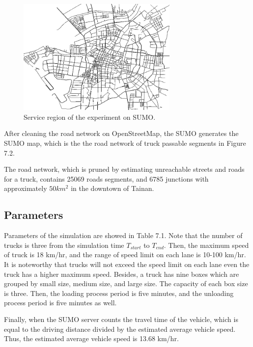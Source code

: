 \documentclass[12pt]{ksthesis}
\begin{document}
\begin{thesis}
{\begin{figure}[H]
\centering
\includegraphics[width=0.7\textwidth]{./Thesis_figures/F7-2_SUMOMap.PNG}
\caption{\large  Service region of the experiment on SUMO.}
\vspace{0.5cm}
\label{Fig:SUMOMap}
\end{figure}

After cleaning the road network on OpenStreetMap, the SUMO generates the SUMO map, which is the the road network of truck passable segments in Figure 7.2.

The road network, which is pruned by estimating unreachable streets and roads for a truck, contains 25069 roads segments, and 6785 junctions with approximately \textbf{$50km^{2}$   }in the downtown of Tainan.




\subsection{Parameters}
Parameters of the simulation are showed in Table 7.1. Note that the number of trucks is three from the simulation time $T_{start}$ to $T_{end}$. 
Then, the maximum speed of truck is 18 km/hr, and the range of speed limit on each lane is 10-100 km/hr. It is noteworthy that trucks will not exceed the speed limit on each lane even the truck has a higher maximum speed. Besides, a truck has nine boxes which are grouped by small size, medium size, and large size. The capacity of each box size is three. 
Then, the loading process period is five minutes, and the unloading process period is five minutes as well. 

Finally, when the SUMO server counts the travel time of the vehicle, which is equal to the driving distance divided by the estimated average vehicle speed. Thus, the estimated average vehicle speed is 13.68 km/hr.



}
\end{thesis}
\end{document}
